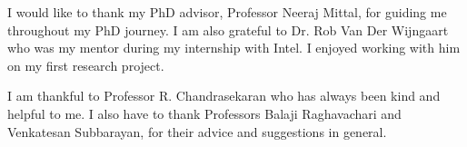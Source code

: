 I would like to thank my PhD advisor, Professor Neeraj Mittal, for guiding me throughout my PhD journey.
I am also grateful to Dr. Rob Van Der Wijngaart who was my mentor during my internship with Intel.
I enjoyed working with him on my first research project.

I am thankful to Professor R. Chandrasekaran who has always been kind and helpful to me.
I also have to thank Professors Balaji Raghavachari and Venkatesan Subbarayan, for their advice and suggestions in general.